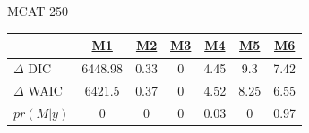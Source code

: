 \documentclass[ xcolor = pdftex, dvipsnames, table ]{beamer}
\begin{document}
\subsection{}
\begin{frame}{MCAT 250}
	\begin{table}[ht!]
        \centering
        \begin{tabular}[c]{@{}lcccccc@{}}
        \hline
        & \href{https://github.com/gasduster99/sppComp/tree/master/sscRuns/25019781982M1}{M1} & \href{https://github.com/gasduster99/sppComp/tree/master/sscRuns/25019781982M2}{M2} & \href{https://github.com/gasduster99/sppComp/tree/master/sscRuns/25019781982M3}{M3} & \href{https://github.com/gasduster99/sppComp/tree/master/sscRuns/25019781982M4}{M4} & \href{https://github.com/gasduster99/sppComp/tree/master/sscRuns/25019781982M5}{M5} & \href{https://github.com/gasduster99/sppComp/tree/master/sscRuns/25019781982M6}{M6} \\ \hline
        \(\Delta\) DIC & 6448.98 & 0.33 & 0 & 4.45 & 9.3 & 7.42 \\
        \(\Delta\) WAIC & 6421.5 & 0.37 & 0 & 4.52 & 8.25 & 6.55 \\
        \(pr(M|y)\) & 0 & 0 & 0 & 0.03 & 0 & 0.97 \\ \hline
        \end{tabular}
        \end{table}
\end{frame}

%
%
\end{document}
